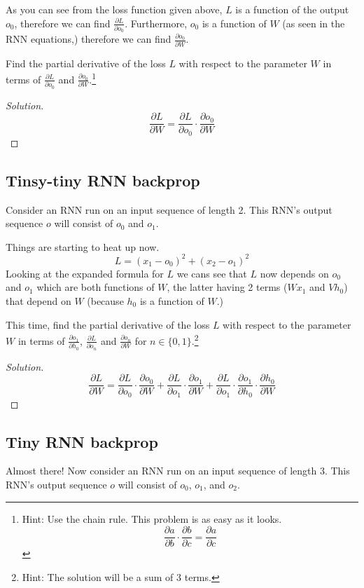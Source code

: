 \documentclass{article}
\begin{document}
As you can see from the loss function given above, $L$ is a function of the output $o_0$, therefore we can find $\frac{\partial L}{\partial o_0}$. Furthermore, $o_0$ is a function of $W$ (as seen in the RNN equations,) therefore we can find $\frac{\partial o_0}{\partial W}$.

Find the partial derivative of the loss $L$ with respect to the parameter $W$ in terms of $\frac{\partial L}{\partial o_0}$ and $\frac{\partial o_0}{\partial W}$.\footnote{Hint: Use the chain rule. This problem is as easy as it looks.
$$ \frac{\partial a}{\partial b} \cdot \frac{\partial b}{\partial c} = \frac{\partial a}{\partial c} $$}

\begin{proof}[Solution]
    $$\frac{\partial L}{\partial W} = \frac{\partial L}{\partial o_0} \cdot \frac{\partial o_0}{\partial W}$$
\end{proof}

\subsection{Tinsy-tiny RNN backprop}
Consider an RNN run on an input sequence of length 2. This RNN's output sequence $o$ will consist of $o_0$ and $o_1$.

Things are starting to heat up now.
$$ L = (x_1 - o_0)^2 + (x_2 - o_1)^2 $$
Looking at the expanded formula for $L$ we cans see that $L$ now depends on $o_0$ and $o_1$ which are both functions of $W$, the latter having 2 terms ($Wx_1$ and $Vh_0$) that depend on $W$ (because $h_0$ is a function of $W$.)

This time, find the partial derivative of the loss $L$ with respect to the parameter $W$ in terms of $\frac{\partial o_1}{\partial h_0}$, $\frac{\partial L}{\partial o_n}$ and $\frac{\partial o_n}{\partial W}$ for $n \in \{0,1\}$.\footnote{Hint: The solution will be a sum of 3 terms.}

\begin{proof}[Solution]
    $$ \frac{\partial L}{\partial W} = \frac{\partial L}{\partial o_0} \cdot \frac{\partial o_0}{\partial W} + \frac{\partial L}{\partial o_1} \cdot \frac{\partial o_1}{\partial W} + \frac{\partial L}{\partial o_1} \cdot \frac{\partial o_1}{\partial h_0} \cdot \frac{\partial h_0}{\partial W} $$
\end{proof}

\subsection{Tiny RNN backprop}
Almost there! Now consider an RNN run on an input sequence of length 3. This RNN's output sequence $o$ will consist of $o_0$, $o_1$, and $o_2$.
\end{document}
